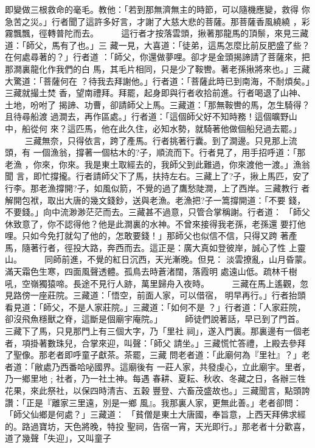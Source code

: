 \begin{pinyinscope}
{即變做三根救命的毫毛。教他：「若到那無濟無主的時節，可以隨機應變，救得
你急苦之災。」行者聞了這許多好言，才謝了大慈大悲的菩薩。那菩薩香風繞繞
，彩霧飄飄，徑轉普陀而去。
　　
這行者才按落雲頭，揪著那龍馬的頂鬃，來見三藏道：「師父，馬有了也。」三
藏一見，大喜道：「徒弟，這馬怎麼比前反肥盛了些？在何處尋著的？」行者道
：「師父，你還做夢哩。卻才是金頭揭諦請了菩薩來，把那澗裏龍化作我們的白
馬，其毛片相同，只是少了鞍轡。著老孫揪將來也。」三藏大驚道：「菩薩何在
？待我去拜謝他。」行者道：「菩薩此時已到南海，不耐煩矣。」三藏就撮土焚
香，望南禮拜。拜罷，起身即與行者收拾前進。行者喝退了山神、土地，吩咐了
揭諦、功曹，卻請師父上馬。三藏道：「那無鞍轡的馬，怎生騎得？且待尋船渡
過澗去，再作區處。」行者道：「這個師父好不知時務！這個曠野山中，船從何
來？這匹馬，他在此久住，必知水勢，就騎著他做個船兒過去罷。」
　　
三藏無奈，只得依言，跨了產馬。行者挑著行囊。到了澗邊。只見那上流頭，有
一個漁翁，撐著一個枯木的?子，順流而下。行者見了，用手招呼道：「那老漁
，你來，你來。我是東土取經去的，我師父到此難過，你來渡他一渡。」漁翁聞
言，即忙撐攏。行者請師父下了馬，扶持左右。三藏上了?子，揪上馬匹，安了
行李。那老漁撐開?子，如風似箭，不覺的過了鷹愁陡澗，上了西岸。三藏教行
者解開包袱，取出大唐的幾文錢鈔，送與老漁。老漁把?子一篙撐開道：「不要
錢，不要錢。」向中流渺渺茫茫而去。三藏甚不過意，只管合掌稱謝。行者道：
「師父休致意了，你不認得他？他是此澗裏的水神。不曾來接得我老孫，老孫還
要打他哩。只如今免打就勾了他的，怎敢要錢！」那師父也似信不信，只得又跨
著產馬，隨著行者，徑投大路，奔西而去。這正是：廣大真如登彼岸，誠心了性
上靈山。
　　
同師前進，不覺的紅日沉西，天光漸晚。但見：
淡雲撩亂，山月昏蒙。滿天霜色生寒，四面風聲透體。孤鳥去時蒼渚闊，落霞明
處遠山低。疏林千樹吼，空嶺獨猿啼。長途不見行人跡，萬里歸舟入夜時。
　　
三藏在馬上遙觀，忽見路傍一座莊院。三藏道：「悟空，前面人家，可以借宿，
明早再行。」行者抬頭看見道：「師父，不是人家莊院。」三藏道：「如何不是
？」行者道：「人家莊院，卻沒飛魚穩獸之脊，這斷是個廟宇庵院。」
　　
師徒們說著話，早已到了門首。三藏下了馬，只見那門上有三個大字，乃「里社
祠」，遂入門裏。那裏邊有一個老者，項掛著數珠兒，合掌來迎，叫聲：「師父
請坐。」三藏慌忙答禮，上殿去參拜了聖像。那老者即呼童子獻茶。茶罷，三藏
問老者道：「此廟何為『里社』？」老者道：「敝處乃西番哈咇國界。這廟後有
一莊人家，共發虔心，立此廟宇。里者，乃一鄉里地﹔社者，乃一社土神。每遇
春耕、夏耘、秋收、冬藏之日，各辦三牲花果，來此祭社，以保四時清吉、五穀
豐登、六畜茂盛故也。」三藏聞言，點頭誇讚：「正是『離家三里遠，別是一鄉
風』。我那裏人家，更無此善。」老者卻問：「師父仙鄉是何處？」三藏道：
「貧僧是東土大唐國，奉旨意，上西天拜佛求經的。路過寶坊，天色將晚，特投
聖祠，告宿一宵，天光即行。」那老者十分歡喜，道了幾聲「失迎」，又叫童子
}
\end{pinyinscope}
